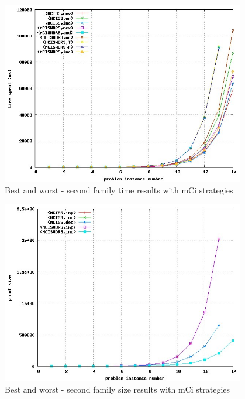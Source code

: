 \documentclass[a4paper,10pt]{book}
\newcommand{\mci}{mCi}
\begin{document}
\begin{figure}[!htbp]
\begin{center}
\includegraphics[width=0.95\textwidth]{../mci_2_c.jpg}
\end{center}
\caption{Best and worst - second family time results with \mci\/ strategies}
\end{figure}


\begin{figure}[!htbp]
\begin{center}
\includegraphics[width=0.95\textwidth]{../mci_2_d.jpg}
\end{center}
\caption{Best and worst - second family size results with \mci\/ strategies}
\end{figure}
\end{document}
